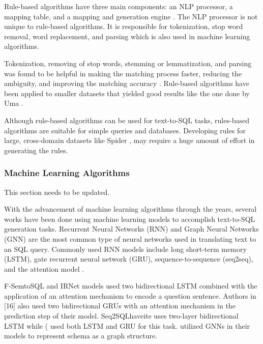 \documentclass[conference]{IEEEtran}
\begin{document}
Rule-based algorithms have three main components: an NLP processor, a mapping table, and a mapping and generation engine \cite{Wong2021ASystems}.  The NLP processor is not unique to rule-based algorithms. It is responsible for tokenization, stop word removal, word replacement, and parsing which is also used in machine learning algorithms. 

Tokenization, removing of stop words, stemming or lemmatization, and parsing was found to be helpful in making the matching process faster, reducing the ambiguity, and improving the matching accuracy \cite{Wong2021ASystems}. Rule-based algorithms have been applied to smaller datasets that yielded good results like the one done by Uma \cite{Uma2019FormationNLP}. 

Although rule-based algorithms can be used for text-to-SQL tasks, rules-based algorithms are suitable for simple queries and databases\cite{Deng2022RecentExpect}. Developing rules for large, cross-domain datasets like Spider \cite{Yu2018Spider:Task}, may require a huge amount of effort in generating the rules.

\subsubsection{Machine Learning Algorithms}

This section needs to be updated.

With the advancement of machine learning algorithms through the years, several works have been done using machine learning models to accomplish text-to-SQL generation tasks. Recurrent Neural Networks (RNN) and Graph Neural Networks (GNN) are the most common type of neural networks used in translating text to an SQL query. Commonly used RNN models include long short-term memory (LSTM),  gate recurrent neural network (GRU), sequence-to-sequence (seq2seq),  and the attention model \cite{Wong2021ASystems}.  

F-SemtoSQL \cite{Li2020AModel} and IRNet \cite{Guo2019ContentGeneration} models used two bidirectional LSTM combined with the application of an attention mechanism to encode a question sentence. Authors in [16] also used two bidirectional GRUs with an attention mechanism in the prediction step of their model. Seq2SQLhaveite\cite{Zhong2017Seq2SQL:Learning} uses two-layer bidirectional LSTM while (\cite{Mellah2021SQLNetworks} used both LSTM and GRU for this task. \cite{Bogin2019RepresentingParsing, Chen2021ShadowGNN:Parser, Hui2022S2SQL:Parsers,Cai2021SADGA:Text-to-SQL,Wang2019RAT-SQL:Parsers} utilized GNNs in their models to represent schema as a graph structure.
\end{document}
